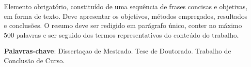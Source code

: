 
\noindent%
Elemento obrigatório, constituído de uma sequência de frases concisas e objetivas, em forma de texto.
Deve apresentar os objetivos, métodos empregados, resultados e conclusões. O resumo deve ser redigido em parágrafo único, conter no máximo 500 palavras e ser seguido dos termos representativos do conteúdo do trabalho. \lipsum[1]

\vfill

\noindent \textbf{Palavras-chave}: Dissertaçao de Mestrado. Tese de Doutorado. Trabalho de Conclusão de Curso.
